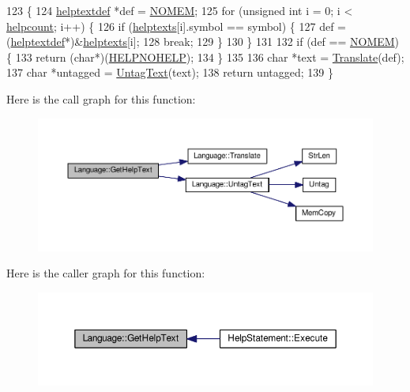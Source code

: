 \begin{DoxyCode}
123 \{
124     \hyperlink{structhelptextdef}{helptextdef} *def = \hyperlink{platform_8h_a46ff2bfbf0d44b8466a2251d5bd5e6f8}{NOMEM};
125     \textcolor{keywordflow}{for} (\textcolor{keywordtype}{unsigned} \textcolor{keywordtype}{int} i = 0; i < \hyperlink{classLanguage_a9eb566a53c9e64a9abd406a77e97d2f0}{helpcount}; i++) \{
126         \textcolor{keywordflow}{if} (\hyperlink{help_8h_acdb22c8ec8de155872a1d1e34bcc4a7f}{helptexts}[i].symbol == symbol) \{
127             def = (\hyperlink{structhelptextdef}{helptextdef}*)&\hyperlink{help_8h_acdb22c8ec8de155872a1d1e34bcc4a7f}{helptexts}[i];
128             \textcolor{keywordflow}{break};
129         \}
130     \}
131 
132     \textcolor{keywordflow}{if} (def == \hyperlink{platform_8h_a46ff2bfbf0d44b8466a2251d5bd5e6f8}{NOMEM}) \{
133         \textcolor{keywordflow}{return} (\textcolor{keywordtype}{char}*)(\hyperlink{text_8h_a45a20702609f9cc519f35b0d9358a2f3}{HELPNOHELP});
134     \}
135 
136     \textcolor{keywordtype}{char} *text = \hyperlink{classLanguage_ae4515a9a4191e57c5ccab61e99687818}{Translate}(def);
137     \textcolor{keywordtype}{char} *untagged = \hyperlink{classLanguage_a69c5b3269ec8570a2f8f28e8e632cf44}{UntagText}(text);
138     \textcolor{keywordflow}{return} untagged;
139 \}
\end{DoxyCode}


Here is the call graph for this function\+:
\nopagebreak
\begin{figure}[H]
\begin{center}
\leavevmode
\includegraphics[width=350pt]{d0/d41/classLanguage_ad2c5b22fcacde4bbff0e3c013dce4a96_cgraph}
\end{center}
\end{figure}




Here is the caller graph for this function\+:
\nopagebreak
\begin{figure}[H]
\begin{center}
\leavevmode
\includegraphics[width=350pt]{d0/d41/classLanguage_ad2c5b22fcacde4bbff0e3c013dce4a96_icgraph}
\end{center}
\end{figure}


